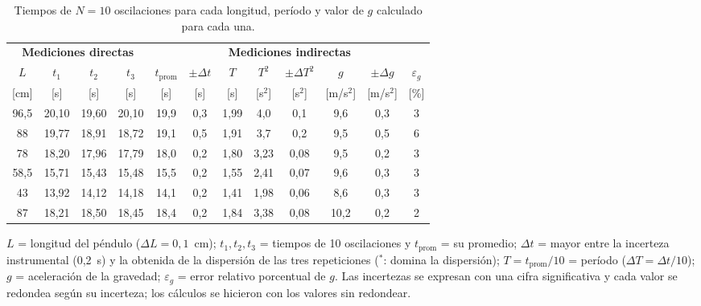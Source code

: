 \documentclass[12pt,a4paper]{article}
\newcommand{\hdr}[1]{\textbf{#1}}
\begin{document}
\begin{table}[H]
\centering
\small
\setlength{\tabcolsep}{3.2pt}
\caption{Tiempos de $N = 10$ oscilaciones para cada longitud, período y valor de $g$
         calculado para cada una.}
\label{tab:pendulo}
\begin{tabular}{cccccccccccc}
  \toprule
  \multicolumn{4}{c}{\hdr{Mediciones directas}} & \multicolumn{8}{c}{\hdr{Mediciones indirectas}} \\
  \cmidrule(lr){1-4}\cmidrule(lr){5-12}
  \hdr{$L$} & \hdr{$t_1$} & \hdr{$t_2$} & \hdr{$t_3$} & \hdr{$t_{\text{prom}}$} &
  \hdr{$\pm\Delta t$} &
  \hdr{$T$} & \hdr{$T^2$} & \hdr{$\pm\Delta T^2$} & \hdr{$g$} & \hdr{$\pm\Delta g$} &
  \hdr{$\varepsilon_g$} \\
  {[cm]} & {[s]} & {[s]} & {[s]} & {[s]} & {[s]} & {[s]} & {[s$^2$]} & {[s$^2$]} & {[m/s$^2$]} &
  {[m/s$^2$]} & {[\%]} \\ \midrule
  96,5 & 20,10 & 19,60 & 20,10 & 19,9 & 0,3\rlap{$^{*}$} & 1,99 & 4,0  & 0,1  & 9,6  & 0,3 & 3 \\
  88   & 19,77 & 18,91 & 18,72 & 19,1 & 0,5\rlap{$^{*}$} & 1,91 & 3,7  & 0,2  & 9,5  & 0,5 & 6 \\
  78   & 18,20 & 17,96 & 17,79 & 18,0 & 0,2 & 1,80 & 3,23 & 0,08 & 9,5  & 0,2 & 3 \\
  58,5 & 15,71 & 15,43 & 15,48 & 15,5 & 0,2 & 1,55 & 2,41 & 0,07 & 9,6  & 0,3 & 3 \\
  43   & 13,92 & 14,12 & 14,18 & 14,1 & 0,2 & 1,41 & 1,98 & 0,06 & 8,6  & 0,3 & 3 \\
  87   & 18,21 & 18,50 & 18,45 & 18,4 & 0,2 & 1,84 & 3,38 & 0,08 & 10,2 & 0,2 & 2 \\
  \bottomrule
\end{tabular}

\smallskip
\begin{minipage}{0.92\textwidth}\footnotesize
$L$ = longitud del péndulo ($\Delta L = 0{,}1$~cm); $t_1, t_2, t_3$ = tiempos de 10
oscilaciones y $t_{\text{prom}}$ = su promedio; $\Delta t$ = mayor entre la incerteza
instrumental (0,2~s) y la obtenida de la dispersión de las tres repeticiones
($^{*}$: domina la dispersión); $T = t_{\text{prom}}/10$ = período
($\Delta T = \Delta t/10$); $g$ = aceleración de la gravedad; $\varepsilon_g$ = error relativo
porcentual de $g$. Las incertezas se expresan con una cifra significativa y cada valor se
redondea según su incerteza; los cálculos se hicieron con los valores sin redondear.
\end{minipage}
\end{table}
\end{document}

